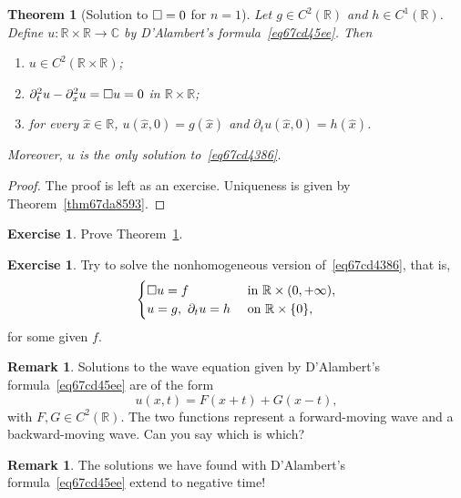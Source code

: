 \documentclass[a4paper,9pt]{amsart}
\newcommand{\R}{\mathbb{R}}	%
\newcommand{\C}{\mathbb{C}}	%
\newcommand{\de}{\partial}		%
\theoremstyle{plain}
\newtheorem{theorem}[proposition]{Theorem}
\theoremstyle{definition}
\newtheorem{remark}[proposition]{Remark}
\newtheorem{exercise}[proposition]{Exercise}%
\theoremstyle{remark}
\begin{document}
\begin{theorem}[Solution to $\square=0$ for $n=1$]\label{thm67cd4667}
	Let $g\in C^2(\R)$ and $h\in C^1(\R)$.
	Define $u:\R\times\R\to \C$ by D'Alambert's formula~\eqref{eq67cd45ee}.
	Then
	\begin{enumerate}
	\item
	$u\in C^2(\R\times\R)$;
	\item
	$\de_t^2u-\de_x^2u = \waveop u=0$ in $\R\times\R$;
	\item
	for every $\hat x\in\R$, $u(\hat x,0) = g(\hat x)$ and $\de_tu(\hat x,0) = h(\hat x)$.
	\end{enumerate}	
	Moreover, $u$ is the only solution to~\eqref{eq67cd4386}.
\end{theorem}
\begin{proof}
	The proof is left as an exercise.
	Uniqueness is given by Theorem~\ref{thm67da8593}.
\end{proof}

\begin{exercise}
	Prove Theorem~\ref{thm67cd4667}.
\end{exercise}

\begin{exercise}
	Try to solve the nonhomogeneous version of~\eqref{eq67cd4386}, that is,
	\begin{equation}\label{eq67d7bc33}
	\begin{cases}
		\waveop u = f & \text{ in }\R\times(0,+\infty) , \\
		u = g,\ \de_tu = h & \text{ on }\R\times\{0\} ,
	\end{cases}
	\end{equation}
	for some given $f$.
\end{exercise}

\begin{remark}\label{rmk67da8652}
	Solutions to the wave equation given by D'Alambert's formula~\eqref{eq67cd45ee} are of the form
	\begin{equation}
		u(x,t) = F(x+t) + G(x-t) ,
	\end{equation}
	with $F,G\in C^2(\R)$.
	The two functions represent a forward-moving wave %
	and a backward-moving wave. %
	Can you say which is which?
\end{remark}

\begin{remark}
	The solutions we have found with D'Alambert's formula~\eqref{eq67cd45ee} extend to negative time!
\end{remark}
\end{document}
